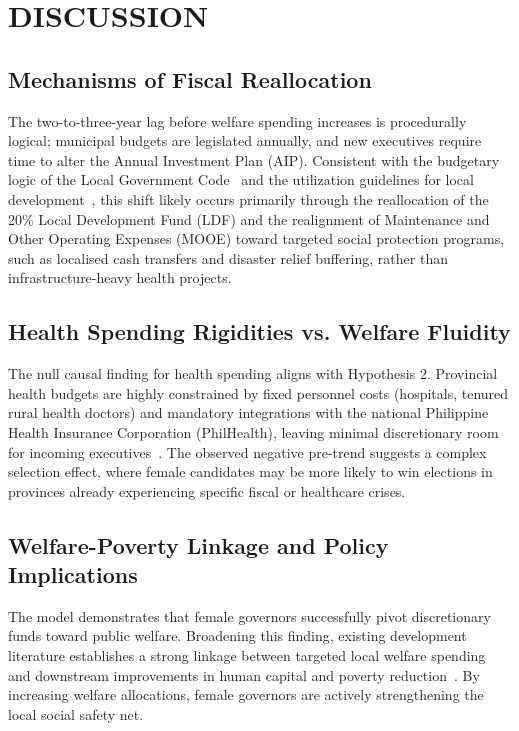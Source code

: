 \documentclass[conference]{IEEEtran}
\begin{document}
\section{DISCUSSION}

\subsection{Mechanisms of Fiscal Reallocation}
The two-to-three-year lag before welfare spending increases is procedurally logical; municipal budgets are legislated annually, and new executives require time to alter the Annual Investment Plan (AIP). Consistent with the budgetary logic of the Local Government Code~\cite{lgc1991} and the utilization guidelines for local development~\cite{dilg_dbm_2017}, this shift likely occurs primarily through the reallocation of the 20\% Local Development Fund (LDF) and the realignment of Maintenance and Other Operating Expenses (MOOE) toward targeted social protection programs, such as localised cash transfers and disaster relief buffering, rather than infrastructure-heavy health projects.

\subsection{Health Spending Rigidities vs. Welfare Fluidity}
The null causal finding for health spending aligns with Hypothesis 2. Provincial health budgets are highly constrained by fixed personnel costs (hospitals, tenured rural health doctors) and mandatory integrations with the national Philippine Health Insurance Corporation (PhilHealth), leaving minimal discretionary room for incoming executives~\cite{lgc1991}. The observed negative pre-trend suggests a complex selection effect, where female candidates may be more likely to win elections in provinces already experiencing specific fiscal or healthcare crises.

\subsection{Welfare-Poverty Linkage and Policy Implications}
The model demonstrates that female governors successfully pivot discretionary funds toward public welfare. Broadening this finding, existing development literature establishes a strong linkage between targeted local welfare spending and downstream improvements in human capital and poverty reduction~\cite{duflo2012women}. By increasing welfare allocations, female governors are actively strengthening the local social safety net.
\end{document}
